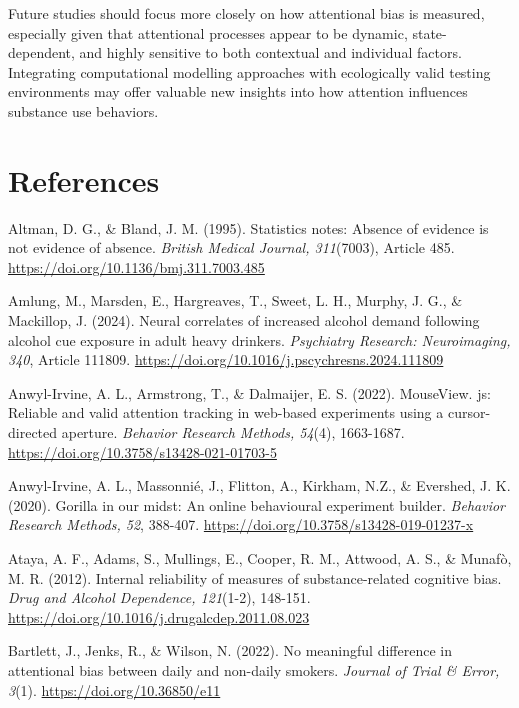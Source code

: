 \documentclass[authordate, empirical]{jote-new-article}
\begin{document}
	Future studies should focus more closely on how attentional bias is measured, especially given that attentional processes appear to be dynamic, state-dependent, and highly sensitive to both contextual and individual factors. Integrating computational modelling approaches with ecologically valid testing environments may offer valuable new insights into how attention influences substance use behaviors.



	\section{References}



	Altman, D. G., \& Bland, J. M. (1995). Statistics notes: Absence of evidence is not evidence of absence. \emph{British Medical Journal, 311}(7003), Article 485. \url{https://doi.org/10.1136/bmj.311.7003.485}



	Amlung, M., Marsden, E., Hargreaves, T., Sweet, L. H., Murphy, J. G., \& Mackillop, J. (2024). Neural correlates of increased alcohol demand following alcohol cue exposure in adult heavy drinkers. \emph{Psychiatry Research: Neuroimaging, 340}, Article 111809. \url{https://doi.org/10.1016/j.pscychresns.2024.111809}



	Anwyl-Irvine, A. L., Armstrong, T., \& Dalmaijer, E. S. (2022). MouseView. js: Reliable and valid attention tracking in web-based experiments using a cursor-directed aperture. \emph{Behavior Research Methods, 54}(4), 1663-1687. \url{https://doi.org/10.3758/s13428-021-01703-5}



	Anwyl-Irvine, A. L., Massonnié, J., Flitton, A., Kirkham, N.Z., \& Evershed, J. K. (2020). Gorilla in our midst: An online behavioural experiment builder. \emph{Behavior Research Methods, 52}, 388-407. \url{https://doi.org/10.3758/s13428-019-01237-x}



	Ataya, A. F., Adams, S., Mullings, E., Cooper, R. M., Attwood, A. S., \& Munafò, M. R. (2012). Internal reliability of measures of substance-related cognitive bias. \emph{Drug and Alcohol Dependence, 121}(1-2), 148-151. \url{https://doi.org/10.1016/j.drugalcdep.2011.08.023}



	Bartlett, J., Jenks, R., \& Wilson, N. (2022). No meaningful difference in attentional bias between daily and non-daily smokers. \emph{Journal of Trial \& Error, 3}(1). \url{https://doi.org/10.36850/e11}
\end{document}
